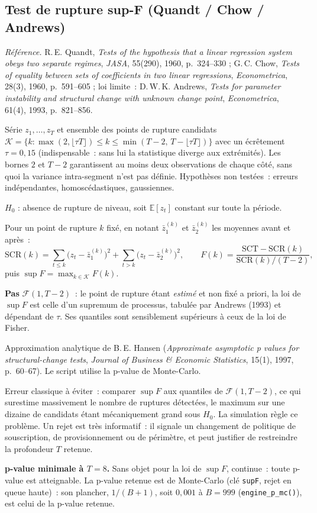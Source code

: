\documentclass[a4paper,11pt]{article}
\newcommand{\code}[1]{\texttt{\small #1}}
\newcommand{\refl}[1]{{\small\textcolor{maincolor!70!black}{\textit{Référence.} #1}}\par\smallskip}
\newcounter{ficheid}
\newenvironment{fiche}[1]{%
  \stepcounter{ficheid}%
  \phantomsection
  \subsection{#1}%
  \label{fiche:\theficheid}%
}{%
  \end{description}\vspace{0.5em}%
}
\newcommand{\Cadre}{%
  \begin{description}[leftmargin=0pt, style=unboxed, itemsep=3pt, topsep=3pt, parsep=2pt]%
  \item[\textcolor{financeblue}{\textbf{1. Cadre, notations et hypothèses de validité (non testées).}}]}
\newcommand{\Hzero}{\item[\textcolor{financeblue}{\textbf{2. Hypothèse nulle.}}]}
\newcommand{\Stat}{\item[\textcolor{financeblue}{\textbf{3. Statistique de test.}}]}
\newcommand{\Loi}{\item[\textcolor{financeblue}{\textbf{4. Loi sous $H_0$.}}]}
\newcommand{\Pval}{\item[\textcolor{financeblue}{\textbf{5. p-value.}}]}
\newcommand{\Usage}{\item[\textcolor{financeblue}{\textbf{6. Usage et limites.}}]}
\newcommand{\Pertinence}{\item[\textcolor{financeblue}{\textbf{7. Pertinence et puissance à faible $T$.}}]}
\begin{document}
\begin{fiche}{Test de rupture sup-F (Quandt / Chow / Andrews)}
\label{fiche:sup-f}%
\refl{R.\,E. Quandt, \emph{Tests of the hypothesis that a linear regression system obeys two
separate regimes}, \emph{JASA}, 55(290), 1960, p.~324--330 ; G.\,C. Chow, \emph{Tests of equality
between sets of coefficients in two linear regressions}, \emph{Econometrica}, 28(3), 1960,
p.~591--605 ; loi limite~: D.\,W.\,K. Andrews, \emph{Tests for parameter instability and
structural change with unknown change point}, \emph{Econometrica}, 61(4), 1993, p.~821--856.}
\Cadre
Série $z_1,\dots,z_T$ et ensemble des points de rupture candidats
$\mathcal{K} = \{k : \max(2, \lfloor \tau T\rfloor) \le k \le \min(T-2,\, T - \lfloor \tau T\rfloor)\}$
avec un écrêtement $\tau = 0{,}15$ (indispensable~: sans lui la statistique diverge aux
extrémités). Les bornes $2$ et $T-2$ garantissent au moins deux observations de chaque côté,
sans quoi la variance intra-segment n'est pas définie.
Hypothèses non testées~: erreurs indépendantes, homoscédastiques, gaussiennes.
\Hzero
$H_0$ : absence de rupture de niveau, soit $\mathbb{E}[z_t]$ constant sur toute la période.
\Stat
Pour un point de rupture $k$ fixé, en notant $\bar z_1^{(k)}$ et $\bar z_2^{(k)}$ les moyennes
avant et après~:
\[
  \mathrm{SCR}(k) = \sum_{t\le k}\big(z_t - \bar z_1^{(k)}\big)^2 + \sum_{t> k}\big(z_t - \bar z_2^{(k)}\big)^2,
  \qquad
  F(k) = \frac{\mathrm{SCT} - \mathrm{SCR}(k)}{\mathrm{SCR}(k)/(T-2)},
\]
puis $\displaystyle \sup F = \max_{k\in\mathcal{K}} F(k)$.
\Loi
\textbf{Pas} $\mathcal{F}(1,T-2)$~: le point de rupture étant \emph{estimé} et non fixé a priori,
la loi de $\sup F$ est celle d'un supremum de processus, tabulée par Andrews (1993) et dépendant
de $\tau$. Ses quantiles sont sensiblement supérieurs à ceux de la loi de Fisher.
\Pval
Approximation analytique de B.\,E. Hansen (\emph{Approximate asymptotic p values for
structural-change tests}, \emph{Journal of Business \& Economic Statistics}, 15(1), 1997,
p.~60--67). Le script utilise la p-value de Monte-Carlo.
\Usage
Erreur classique à éviter~: comparer $\sup F$ aux quantiles de $\mathcal{F}(1,T-2)$, ce qui
surestime massivement le nombre de ruptures détectées, le maximum sur une dizaine de candidats
étant mécaniquement grand sous $H_0$. La simulation règle ce problème. Un rejet est très
informatif~: il signale un changement de politique de souscription, de provisionnement ou de
périmètre, et peut justifier de restreindre la profondeur $T$ retenue.
\Pertinence
\textbf{p-value minimale à $T = 8$.} Sans objet pour la loi de $\sup F$, continue~: toute p-value est atteignable. La p-value retenue est de Monte-Carlo (clé \code{supF}, rejet en queue haute)~: son plancher, $1/(B+1)$, soit $0{,}001$ à $B = 999$ (\code{engine\_p\_mc()}), est celui de la p-value retenue.


\end{fiche}
\end{document}
